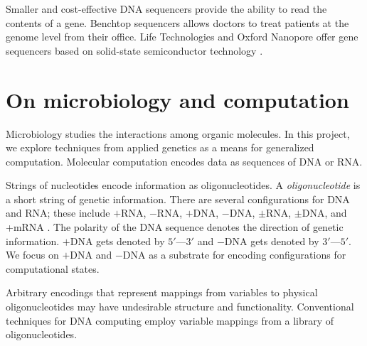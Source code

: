 		
Smaller and cost-effective DNA sequencers provide the ability to read the contents of a gene.  Benchtop sequencers \cite{ionTorrent, oxfordNanopore} allows doctors to treat patients at the genome level from their office.  Life Technologies and Oxford Nanopore offer gene sequencers based on solid-state semiconductor technology \cite{ionTorrent, oxfordNanopore}.	

\section{On microbiology and computation}

	
	Microbiology studies the interactions among organic molecules.  In this project, we explore techniques from applied genetics as a means for generalized computation.  Molecular computation encodes data as sequences of DNA or RNA.  
	
		

	
	Strings of nucleotides encode information as oligonucleotides.  A \textit{oligonucleotide} is a short string of genetic information.  There are several configurations for DNA and RNA; these include $+$RNA, $-$RNA, $+$DNA, $-$DNA, $\pm$RNA, $\pm$DNA, and +mRNA \cite{baltimore1971exp}.  The polarity of the DNA sequence denotes the direction of genetic information.  $+$DNA gets denoted by $5'$---$3'$ and $-$DNA gets denoted by $3'$---$5'$.  We focus on $+$DNA and $-$DNA as a substrate for encoding configurations for computational states.
	
	Arbitrary encodings that represent mappings from variables to physical oligonucleotides may have undesirable structure and functionality.  Conventional techniques for DNA computing employ variable mappings from a library of oligonucleotides.
	
